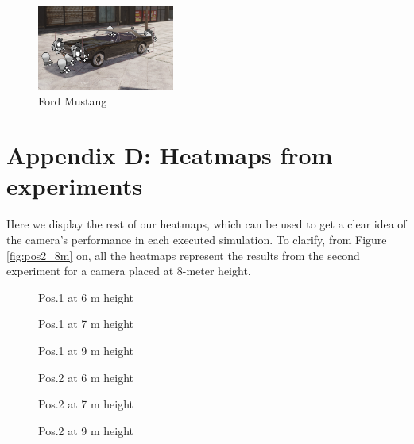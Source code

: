 \begin{figure} [h!]
    \centering
    \includegraphics[width=0.4\textwidth]{images/ford_mustang.png}
    \caption[Ford Mustang]{Ford Mustang}
    \label{fig:ford_mustang}
\end{figure}

\newpage
{}
\section*{Appendix D: Heatmaps from experiments} \label{appendix_heatmaps}

Here we display the rest of our heatmaps, which can be used to get a clear idea of the camera's performance in each executed simulation. To clarify, from Figure \ref{fig:pos2_8m} on, all the heatmaps represent the results from the second experiment for a camera placed at 8-meter height.

\begin{figure}[!htb]
  
  \caption{Pos.1 at 6 m height}\label{fig:pos1_6m}
\endminipage\hfill
{}
  
  \caption{Pos.1 at 7 m height}\label{fig:pos1_7m}
\endminipage\hfill
\end{figure}

\begin{figure}[!htb]
  
  \caption{Pos.1 at 9 m height}\label{fig:pos1_9m}
\endminipage\hfill
{}
  
  \caption{Pos.2 at 6 m height}\label{fig:pos2_6m}
\endminipage\hfill
\end{figure}

\begin{figure}[!htb]
  
  \caption{Pos.2 at 7 m height}\label{fig:pos2_7m}
\endminipage\hfill
{}
  
  \caption{Pos.2 at 9 m height}\label{fig:pos2_9m}
\endminipage\hfill
\end{figure}

